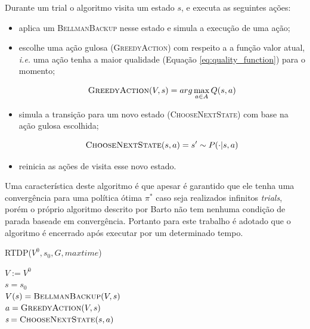 \documentclass[letterpaper]{article}
\begin{document}
Durante um trial o algoritmo visita um estado $s$, e executa as seguintes ações:

\begin{itemize}
    \item aplica um \textsc{BellmanBackup} nesse estado e simula a execução de uma ação;
    \item escolhe uma ação gulosa (\textsc{GreedyAction}) com respeito a a função valor atual, \textit{i.e.} uma ação tenha a maior qualidade (Equação \ref{eq:quality_function}) para o momento;

    \begin{equation} \label{eq:greedy_action}
        \textsc{GreedyAction}(V, s) = arg \max_{a \in A} Q(s,a)
    \end{equation}

    \item simula a transição para um novo estado (\textsc{ChooseNextState}) com base na ação gulosa escolhida;

    \begin{equation} \label{eq:bellman_backup}
        \textsc{ChooseNextState}(s, a) = s' \sim P(\cdot|s,a)
    \end{equation}

    \item reinicia as ações de visita esse novo estado.
\end{itemize}

Uma característica deste algoritmo é que apesar é garantido que ele tenha uma convergência para uma política ótima $\pi^*$ caso seja realizados infinitos \emph{trials}, porém o próprio algoritmo descrito por Barto não tem nenhuma condição de parada baseade em convergência. Portanto para este trabalho é adotado que o algoritmo é encerrado após executar por um determinado tempo.

\linesnumbered
\begin{algorithm}[t]
{
	\caption{\textsc{RTDP}($ V^0, s_0, G, maxtime $)}
	\label{alg:rtdp-enum}

	$V := V^0$\\

	{
    	$\textit{s} = s_0 $\\

		{
			$V(s) = \textsc{BellmanBackup}(V, s)$ \\
           	$a = \textsc{GreedyAction}(V, s)$ \\
           	$\textit{s} = \textsc{ChooseNextState}(s, a)$ \\
		}
	}
}
\end{algorithm}
\end{document}
